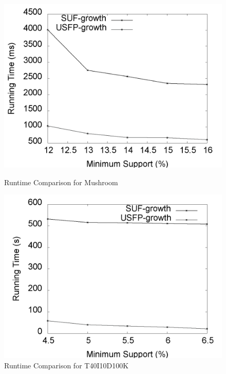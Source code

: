 \documentclass[conference]{IEEEtran}
\begin{document}
%    
\begin{figure}[t]
	\begin{minipage}{0.24\linewidth}
		\centering
		\includegraphics[width=\textwidth]{images/result/g_m_total}
		\caption{ Runtime Comparison for Mushroom}
		\label{result:g_m_total}
	\end{minipage}%
    \begin{minipage}{0.24\linewidth}
		\centering
		\includegraphics[width=\textwidth]{images/result/g_t10_total}
		\caption{ Runtime Comparison for T40I10D100K}
		\label{result:g_t10_total}
    \end{minipage}
	\begin{minipage}{0.24\linewidth}

\end{minipage}
\end{figure}
\end{document}

